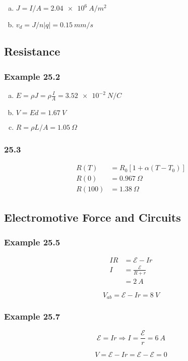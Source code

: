 \documentclass{article}
\begin{document}
\begin{enumerate}[(a)]
  \item $J = I / A = \qty{2.04e6}{A/m^2}$

  \item $v_d = J / n |q| = \qty{0.15}{mm/s}$
\end{enumerate}

\setcounter{subsection}{2}
\subsection{Resistance}

\subsubsection{Example 25.2}

\begin{enumerate}[(a)]
  \item $E = \rho J = \rho \frac{I}{A} = \qty{3.52e-2}{N/C}$

  \item $V = E d = \qty{1.67}{V}$

  \item $R = \rho L / A = \qty{1.05}{\Omega}$
\end{enumerate}

\subsubsection{25.3}

\begin{align*}
  R(T)   & = R_0 [1 + \alpha (T - T_0)] \\
  R(0)   & = \qty{0.967}{\Omega}        \\
  R(100) & = \qty{1.38}{\Omega}
\end{align*}

\subsection{Electromotive Force and Circuits}

\subsubsection{Example 25.5}

\begin{align*}
  I R & = \mathcal{E} - I r         \\
  I   & = \frac{\mathcal{E}}{R + r} \\
      & = \qty{2}{A}
\end{align*}

\[V_{ab} = \mathcal{E} - I r = \qty{8}{V}\]

\subsubsection{Example 25.7}

\[\mathcal{E} = I r \Rightarrow I = \frac{\mathcal{E}}{r} = \qty{6}{A}\]

\[V = \mathcal{E} - I r = \mathcal{E} - \mathcal{E} = 0\]
\end{document}

